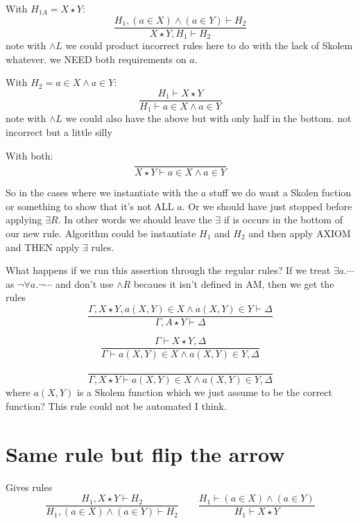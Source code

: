 \documentclass[12pt]{article}
\begin{document}
With $H_{1A}=X\star Y$:
\[
    \frac{H_{1},(a\in X)\wedge(a\in Y)\vdash H_2}{X\star
    Y,H_{1}\vdash H_2}
\]
note with $\wedge L$ we could product incorrect rules here to do with the lack
of Skolem whatever. we NEED both requirements on $a$.

With $H_2=a\in X\wedge a\in Y$:
\[
    \frac{H_{1}\vdash X\star Y}{H_{1}\vdash a\in X\wedge a\in Y}
\]
note with $\wedge L$ we could also have the above but with only half in the
bottom. not incorrect but a little silly

With both:
\[
\frac{}{X\star Y\vdash a\in X\wedge a\in Y}
\]

So in the cases where we instantiate with the $a$ stuff we do want a Skolen
fuction or something to show that it's not ALL $a$. Or we should have just
stopped before applying $\exists R$. In other words we should leave the
$\exists$ if is occurs in the bottom of our new rule. Algorithm could be
instantiate $H_1$ and $H_2$ and then apply AXIOM and THEN apply $\exists$ rules.

What happens if we run this assertion through the regular rules? If we treat
$\exists a.\cdots$ as $\neg\forall a.\neg\cdots$ and don't use $\wedge R$
becaues it isn't defined in AM, then we get the rules
\[
    \frac{\Gamma,X\star Y,a(X,Y)\in X\wedge a(X,Y)\in Y\vdash\Delta}{\Gamma,A\star Y\vdash\Delta}
\]

\[
    \frac{\Gamma\vdash X\star Y,\Delta}{\Gamma\vdash a(X,Y)\in X\wedge a(X,Y)\in
    Y,\Delta}
\]

\[
    \frac{}{\Gamma,X\star Y\vdash a(X,Y)\in X\wedge a(X,Y)\in Y,\Delta}
\]
where $a(X,Y)$ is a Skolem function which we just assume to be the correct
function? This rule could not be automated I think.

\section{Same rule but flip the arrow}

\begin{prooftree}
\end{prooftree}
Gives rules
\[
\frac{H_1,X\star Y\vdash H_2}{H_1,(a\in X)\wedge(a\in Y)\vdash H_2}\quad\quad
\frac{H_1\vdash (a\in X)\wedge(a\in Y)}{H_1\vdash X\star Y}
\]
\end{document}
